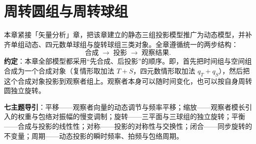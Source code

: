\chapter{周转圆组与周转球组}
\label{chap:dyn_epicycle}

\begin{remark}[本章定位]\label{rem:dyn_chapter_positioning}
本章紧接「矢量分析」章，把该章建立的静态三组投影模型推广为动态模型，并补齐单组动态、四元数单球组与旋转球组三类对象。全章遵循统一的两步结构：
\[
\textbf{合成} \;\longrightarrow\; \textbf{投影} \;\longrightarrow\; \textbf{观察结果}.
\]
\textbf{约定}：本章全部模型都采用“先合成、后投影”的顺序。即，首先把时间组与空间组合成为一个合成对象（复情形取加法 $T+S$，四元数情形取加法 $q_T+q_S$），然后把这个合成对象投影到观察者组上。观察者本身可以随时间变化，也可以按自身周转圆独立旋转。

\textbf{七主题导引}：平移——观察者向量的动态调节与频率平移；缩放——观察者模长引入的权重与包络对振幅的慢变调制；旋转——三平面与三球组的独立旋转；平衡——合成与投影的线性性；对称——投影的对称性与交换性；闭合——同步旋转的不变量；周期——动态投影的瞬时频率、拍频与包络周期。
\end{remark}

